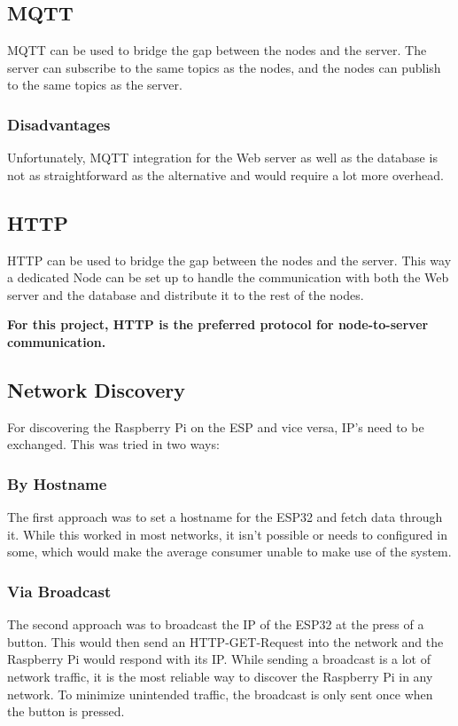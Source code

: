     \subsection{MQTT}
    MQTT can be used to bridge the gap between the nodes and the server.
    The server can subscribe to the same topics as the nodes, and the nodes
    can publish to the same topics as the server.

        \subsubsection{Disadvantages}
        Unfortunately, MQTT integration for the Web server as well as the database
        is not as straightforward as the alternative and would require a lot more 
        overhead.

    \subsection{HTTP}
    HTTP can be used to bridge the gap between the nodes and the server.
    This way a dedicated Node can be set up to handle the communication
    with both the Web server and the database and distribute it to the 
    rest of the nodes.

    \vspace{1cm}
    \textbf{For this project, HTTP is the preferred protocol for 
    node-to-server communication.}

    \subsection{Network Discovery}
    For discovering the Raspberry Pi on the ESP and vice versa,
    IP's need to be exchanged. This was tried in two ways:
        \subsubsection{By Hostname}
        The first approach was to set a hostname for the 
        ESP32 and fetch data through it. While this worked
        in most networks, it isn't possible or needs to 
        configured in some, which would make the average 
        consumer unable to make use of the system.

        \subsubsection{Via Broadcast}
        The second approach was to broadcast the IP of the ESP32
        at the press of a button. This would then send an 
        HTTP-GET-Request into the network and the Raspberry Pi
        would respond with its IP. While sending a broadcast is
        a lot of network traffic, it is the most reliable way
        to discover the Raspberry Pi in any network. To minimize
        unintended traffic, the broadcast is only sent once when the
        button is pressed.
        

